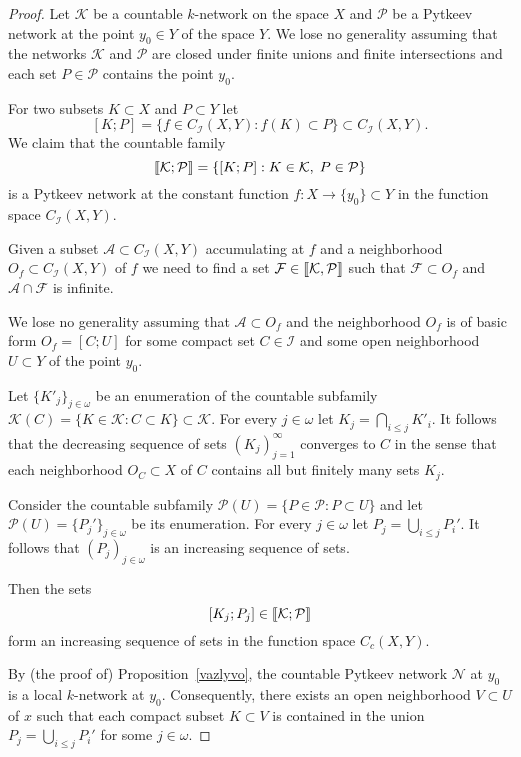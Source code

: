 \documentclass{amsart}
\theoremstyle{definition}
\begin{document}
\begin{proof}
Let $\mathcal K$ be a countable $k$-network on the space $X$ and $\mathcal P$ be a Pytkeev network at the point $y_0\in Y$ of the space $Y$. We lose no generality assuming that the networks $\mathcal K$ and $\mathcal P$ are closed under finite unions and finite intersections and each set $P\in\mathcal P$ contains the point $y_0$.

For two subsets $K\subset X$ and $P\subset Y$ let
$$[K;P]=\{f\in C_{\mathcal I}(X,Y):f(K)\subset P\}\subset C_{\mathcal I}(X,Y).$$
We claim that the countable family
$$[\kern-1.5pt[\mathcal K;\mathcal P]\kern-1.5pt]=\{[K;P]:K\in{\mathcal K},\;P\in\mathcal P\}$$
is a Pytkeev network at the constant function $f:X\to\{y_0\}\subset Y$ in the function space $C_{\mathcal I}(X,Y)$.

Given a subset ${\mathcal A}\subset C_{\mathcal I}(X,Y)$ accumulating at $f$ and a neighborhood $O_f\subset C_{\mathcal I}(X,Y)$ of $f$ we need to find a set ${\mathcal F}\in[\kern-1.5pt[{\mathcal K},{\mathcal P}]\kern-1.5pt]$ such that ${\mathcal F}\subset O_f$ and ${\mathcal A}\cap {\mathcal F}$ is infinite.

We lose no generality assuming that ${\mathcal A}\subset O_f$ and the neighborhood $O_f$ is of basic form
$O_f=[C;U]$
for some compact set $C\in{\mathcal I}$ and some open neighborhood $U\subset Y$ of the point $y_0$.

Let $\{K'_{j}\}_{j\in{\omega}}$ be an enumeration of the countable subfamily ${\mathcal K}(C)=\{K\in{\mathcal K}:C\subset K\}\subset{\mathcal K}$. For every $j\in{\omega}$ let
$K_{j}=\bigcap_{i\le j}K'_{i}$. It follows that the decreasing sequence of sets  $(K_{j})_{j=1}^\infty$ converges to $C$ in the sense that each neighborhood $O_C\subset X$ of $C$ contains all but finitely many sets $K_{j}$.

Consider the countable subfamily $\mathcal P(U)=\{P\in\mathcal P:P\subset U\}$ and let $\mathcal P(U)=\{P_j'\}_{j\in{\omega}}$ be its enumeration. For every $j\in{\omega}$ let $P_{j}=\bigcup_{i\le j}P_{i}'$. It follows that $(P_{j})_{j\in{\omega}}$ is an increasing sequence of sets.

Then the sets
$$[K_{j};P_{j}]\in[\kern-1.5pt[\mathcal K;\mathcal P]\kern-1.5pt]$$form an increasing sequence of sets in the function space $C_{c}(X,Y)$.

By (the proof of) Proposition~\ref{vazlyvo}, the countable Pytkeev network $\mathcal N$ at $y_0$ is a local $k$-network at $y_0$.
Consequently, there exists an open neighborhood $V\subset U$ of $x$ such that each compact subset $K\subset V$ is contained in the union $P_j=\bigcup_{i\le j}P_i'$ for some $j\in{\omega}$.


\end{proof}
\end{document}
